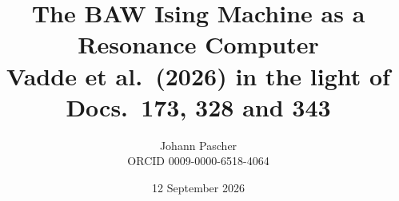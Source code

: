 \documentclass[11pt,a4paper]{report}
\title{The BAW Ising Machine as a Resonance Computer\\[0.5em]
  \large Vadde et al.\ (2026) in the light of Docs.~173, 328 and 343}
\date{12 September 2026}
\author{Johann Pascher\\\small ORCID 0009-0000-6518-4064}
\begin{document}
\renewcommand{\thechapter}{}
\renewcommand{\thesection}{\arabic{section}}
\maketitle
\tableofcontents

\end{document}
